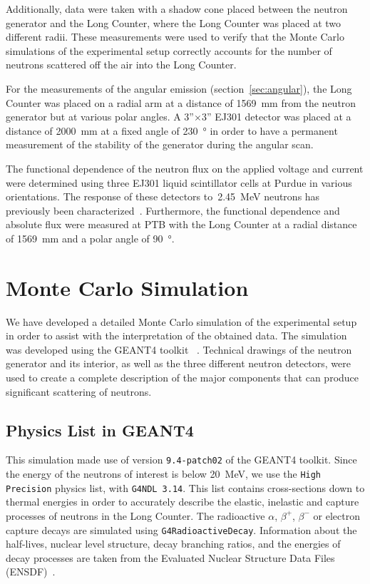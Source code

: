 Additionally, data were taken with a shadow cone placed between the neutron generator and the Long Counter, where the Long Counter was placed at two different radii. These measurements were used to verify that the Monte Carlo simulations of the experimental setup correctly accounts for the number of neutrons scattered off the air into the Long Counter.

For the measurements of the angular emission (section~\ref{sec:angular}), the Long Counter was placed on a radial arm at a distance of \SI{1569}{mm} from the neutron generator but at various polar angles. A 3''$\times$3'' EJ301 detector was placed at a distance of \SI{2000}{mm} at a fixed angle of \SI{230}{\degree} in order to have a permanent measurement of the stability of the generator during the angular scan.

The functional dependence of the neutron flux on the applied voltage and current were determined using three EJ301 liquid scintillator cells at Purdue in various orientations. The response of these detectors to~\SI{2.45}{MeV} neutrons has previously been characterized~\cite{lang2016}. Furthermore, the functional dependence and absolute flux were measured at PTB with the Long Counter at a radial distance of \SI{1569}{mm} and a polar angle of \SI{90}{\degree}.


\section{Monte Carlo Simulation}

We have developed a detailed Monte Carlo simulation of the experimental setup in order to assist with the interpretation of the obtained data. The simulation was developed using the GEANT4 toolkit ~\cite{Agostinelli2003250}.  Technical drawings of the neutron generator and its interior, as well as the three different neutron detectors, were used to create a complete description of the major components that can produce significant scattering of neutrons.

\subsection{Physics List in GEANT4}

This simulation made use of version \texttt{9.4-patch02} of the GEANT4 toolkit. Since the energy of the neutrons of interest is below \SI{20}{MeV}, we use the \texttt{High Precision} physics list, with \texttt{G4NDL 3.14}. This list contains cross-sections down to thermal energies in order to accurately describe the elastic, inelastic and capture processes of neutrons in the Long Counter. The radioactive $\alpha$, $\beta^{+}$, $\beta^{-}$ or electron capture decays are simulated using \texttt{G4RadioactiveDecay}. Information about the half-lives, nuclear level structure, decay branching ratios, and the energies of decay processes are taken from the Evaluated Nuclear Structure Data Files (ENSDF)~\cite{Bhat1992}.

